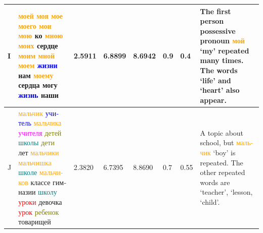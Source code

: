 \documentclass[11pt,a4paper]{article}
\begin{document}
\begin{landscape}
\begin{center}
\end{center}
\begin{center}
\begin{tabularx}{\textwidth}{|l|X|l|l|l|l|l|X|}\hline
    I & \foreignlanguage{russian}{\textcolor{orange}{моей моя мое моего мои мою} ко \textcolor{orange}{мною моих} сердце \textcolor{orange}{моим мной моем} \textcolor{blue}{жизни} нам \textcolor{orange}{моему} сердца могу \textcolor{blue}{жизнь} наши} & 2.5911 & 6.8899 & 8.6942 & 0.9 & 0.4 & The first person possessive pronoun \foreignlanguage{russian}{\textcolor{orange}{мой}} `my' repeated many times. The words `life' and `heart' also appear.  \\ \hline
    J & \foreignlanguage{russian}{\textcolor{orange}{мальчик} \textcolor{blue}{учитель} \textcolor{orange}{мальчика} \textcolor{magenta}{учителя} \textcolor{olive}{детей} \textcolor{teal}{школы} \textcolor{olive}{дети} лет \textcolor{orange}{мальчики мальчишка} \textcolor{teal}{школе} \textcolor{orange}{мальчиков} классе гимназии \textcolor{teal}{школу} \textcolor{red}{уроки} девочка \textcolor{red}{урок} \textcolor{olive}{ребенок} товарищей} & 2.3820 & 6.7395 & 8.8690 & 0.7 & 0.55 & A topic about school, but \foreignlanguage{russian}{\textcolor{orange}{мальчик}} `boy' is repeated. The other repeated words are `teacher', `lesson, `child'. \\ \hline
\end{tabularx}
\end{center}


\begin{center}
\label{table:post_stem_topics}


\end{center}
\end{landscape}
\end{document}
